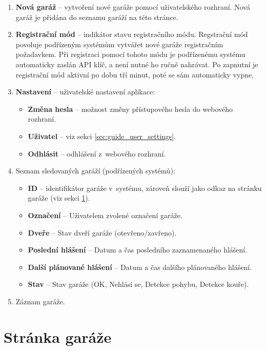 \begin{enumerate}
    \item \textbf{Nová garáž} -- vytvoření nové garáže pomocí uživatelského rozhraní. Nová garáž je přidána do seznamu garáží na této stránce.
    \item \textbf{Registrační mód} -- indikátor stavu registračního módu. Regstrační mód povoluje podřízeným systémům vytvářet nové garáže registračním požadavkem. Při registraci pomocí tohoto módu je podřízenému systému automaticky zaslán API klíč, a není nutné ho ručně nahrávat. Po zapnutní je registrační mód aktivní po dobu tří minut, poté se sám automaticky vypne.
    \item \textbf{Nastavení} -- uživatelské nastavení aplikace:
    \begin{itemize}
        \item \textbf{Změna hesla} -- možnost změny přístupového hesla do webového rozhraní.
        \item \textbf{Uživatel} -- viz sekci \ref{sec:guide_user_settings}.
        \item \textbf{Odhlásit} -- odhlášení z~webového rozhraní.
    \end{itemize}
    \item Seznam sledovaných garáží (podřízených systémů):
    \begin{itemize}
        \item \textbf{ID} -- identifikátor garáže v~systému, zároveň slouží jako odkaz na stránku garáže (viz sekci \ref{sec:guide_garage_page}).
        \item \textbf{Označení} -- Uživatelem zvolené označení garáže.
        \item \textbf{Dveře} -- Stav dveří garáže (otevřeno/zavřeno).
        \item \textbf{Poslední hlášení} -- Datum a čas posledního zaznamenaného hlášení.
        \item \textbf{Další plánované hlášení} -- Datum a čas dalšího plánovaného hlášení.
        \item \textbf{Stav} -- Stav garáže (OK, Nehlásí se, Detekce pohybu, Detekce kouře).
    \end{itemize}
    \item Záznam garáže.
\end{enumerate}

\newpage

\section{Stránka garáže}
\label{sec:guide_garage_page}

